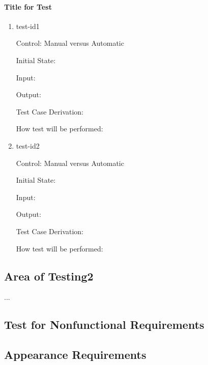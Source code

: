 \documentclass[12pt, titlepage]{article}
\begin{document}
\paragraph{Title for Test}

\begin{enumerate}

\item{test-id1\\}

Control: Manual versus Automatic
					
Initial State: 
					
Input: 
					
Output: 

Test Case Derivation: 
					
How test will be performed: 
					
\item{test-id2\\}

Control: Manual versus Automatic
					
Initial State: 
					
Input: 
					
Output: 

Test Case Derivation: 

How test will be performed: 

\end{enumerate}

\subsection{Area of Testing2}

...

\setlength\parindent{0pt}
\maketitle

\subsection{Test for Nonfunctional Requirements  }

\subsection{Appearance Requirements }
\end{document}
